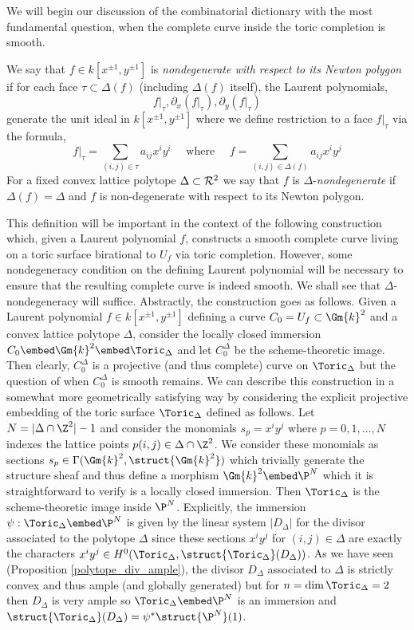 \noindent
We will begin our discussion of the combinatorial dictionary with the most fundamental question, when the complete curve inside the toric completion is smooth. 

\begin{defn}
We say that $f \in k[x^{\pm 1}, y^{\pm 1}]$ is \textit{nondegenerate with respect to its Newton polygon} if for each face $\tau \subset \Delta(f)$ (including $\Delta(f)$ itself), the Laurent polynomials,
\[ f|_\tau, \partial_x (f|_\tau), \partial_y (f|_\tau) \]
generate the unit ideal in $k[x^{\pm 1}, y^{\pm 1}]$ where we define restriction to a face $f|_\tau$ via the formula,
\[ f |_{\tau} = \sum_{(i, j) \in \tau} a_{ij} x^i y^i \quad \text{ where } \quad f = \sum_{(i,j) \in \Delta(f)} a_{ij} x^i y^j \]
For a fixed convex lattice polytope $\Delta \subset \mathcal{R}^2$ we say that $f$ is $\Delta$-\textit{nondegenerate} if $\Delta(f) = \Delta$ and $f$ is non-degenerate with respect to its Newton polygon. 
\end{defn}
\noindent
This definition will be important in the context of the following construction which, given a Laurent polynomial $f$, constructs a smooth complete curve living on a toric surface birational  to $U_f$ via toric completion. However, some nondegeneracy condition on the defining Laurent polynomial will be necessary to ensure that the resulting complete curve is indeed smooth. We shall see that $\Delta$-nondegeneracy will suffice. Abstractly, the construction goes as follows. Given a Laurent polynomial $f \in k[x^{\pm 1}, y^{\pm 1}]$ defining a curve $C_0 = U_f \subset \Gm{k}^2$ and a convex lattice polytope $\Delta$, consider the locally closed immersion $C_0 \embed \Gm{k}^2 \embed \Toric_\Delta$ and let $C_0^\Delta$ be the scheme-theoretic image. Then clearly, $C_0^\Delta$ is a projective (and thus complete) curve on $\Toric_\Delta$ but the question of when $C_0^\Delta$ is smooth remains. We can describe this construction in a somewhat more geometrically satisfying way by considering the explicit projective embedding of the toric surface $\Toric_\Delta$ defined as follows. Let $N = | \Delta \cap \Z^2| - 1$ and consider the monomials $s_p = x^i y^j$ where $p = 0, 1, \dots, N$ indexes the lattice points $p(i, j) \in \Delta \cap \Z^2$. We consider these monomials as sections $s_p \in \Gamma(\Gm{k}^2, \struct{\Gm{k}^2})$ which trivially generate the structure sheaf and thus define a morphism $\Gm{k}^2 \embed \P^N$ which it is straightforward to verify is a locally closed immersion. Then $\Toric_\Delta$ is the scheme-theoretic image inside $\P^N$. Explicitly, the immersion $\psi : \Toric_\Delta \embed \P^N$ is given by the linear system $|D_\Delta|$ for the divisor associated to the polytope $\Delta$ since these sections $x^i y^j$ for $(i, j) \in \Delta$ are exactly the characters $x^i y^j \in H^0(\Toric_\Delta, \struct{\Toric_\Delta}(D_\Delta))$. As we have seen (Proposition \ref{polytope_div_ample}), the divisor $D_\Delta$ associated to $\Delta$ is strictly convex and thus ample (and globally generated) but for $n = \dim{\Toric_\Delta} = 2$ then $D_\Delta$ is very ample so $\Toric_\Delta \embed \P^N$ is an immersion and $\struct{\Toric_\Delta}(D_\Delta) = \psi^* \struct{\P^N}(1)$. 
